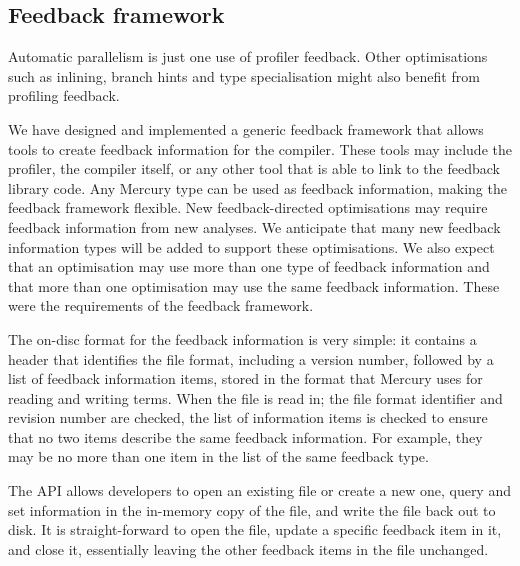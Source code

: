 \subsection{Feedback framework}
\label{sec:feedback}

Automatic parallelism is just one use of profiler feedback.
Other optimisations
such as inlining,
branch hints
and type specialisation
might also benefit from profiling feedback.

We have designed and implemented a generic feedback framework that allows
tools to create feedback information for the compiler.
These tools may include the profiler, the compiler itself,
or any other tool that is able to link to the feedback library code.
Any Mercury type can be used as feedback information,
making the feedback framework flexible.
New feedback-directed optimisations may require feedback information
from new analyses.
We anticipate that many new feedback information types will be added to
support these optimisations.
We also expect that an optimisation may use more than one type of
feedback information and that more than one optimisation may use the
same feedback information.
These were the requirements of the feedback framework.

The on-disc format for the feedback information is very simple:
it contains a header that identifies the file format,
including a version number,
followed by a list of feedback information items,
stored in the format that Mercury uses for reading and writing
terms.
When the file is read in;
the file format identifier and revision number are checked,
the list of information items is checked to ensure that no two items
describe the same feedback information.
For example,
they may be no more than one item in the list of the same feedback type.

The API allows developers to open an existing file or create a new one,
query and set information in the in-memory copy of the file,
and write the file back out to disk.
It is straight-forward to open the file,
update a specific feedback item in it,
and close it,
essentially leaving the other feedback items in the file unchanged.



